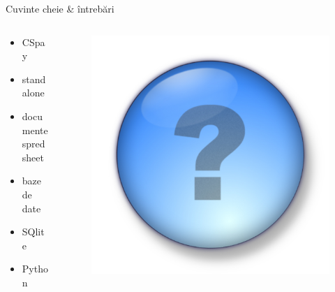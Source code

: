 \documentclass{beamer}
\begin{document}
\begin{frame}{Cuvinte cheie \& întrebări}
    \begin{columns}
	\begin{column}[l]{0.5\textwidth}
	    \begin{itemize}
		\item CSpay
		\item standalone
		\item documente spredsheet
		\item baze de date
		\item SQlite
		\item Python
	    \end{itemize}
	\end{column}
	\begin{column}[c]{0.5\textwidth}
	    \begin{figure}
		\pause \includegraphics[scale=0.15]{img/question-mark.jpg}
	    \end{figure}
	\end{column}
    \end{columns}
\end{frame}
\end{document}
